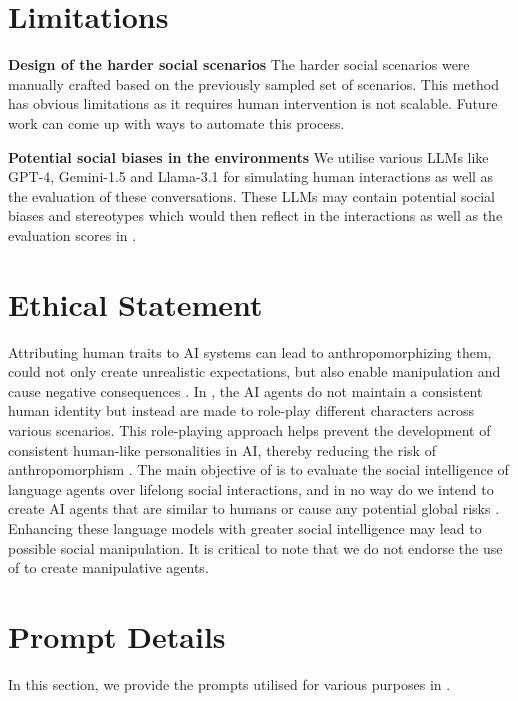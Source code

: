 \appendix

\section{Limitations}
\label{appendix:limitations}
\textbf{Design of the harder social scenarios} \quad The harder social scenarios were manually crafted based on the previously sampled set of scenarios. This method has obvious limitations as it requires human intervention is not scalable. Future work can come up with ways to automate this process.

\textbf{Potential social biases in the environments} \quad We utilise various LLMs like GPT-4, Gemini-1.5 and Llama-3.1 for simulating human interactions as well as the evaluation of these conversations. These LLMs may contain potential social biases and stereotypes which would then reflect in the interactions as well as the evaluation scores in \lifelongsotopia. 

\section{Ethical Statement}
\label{appendix:ethical}
Attributing human traits to AI systems can lead to anthropomorphizing them, could not only create unrealistic expectations, but also enable manipulation and cause negative consequences \citep{deshpande2023anthropomorphizationaiopportunitiesrisks}. In \lifelongsotopia, the AI agents do not maintain a consistent human identity but instead are made to role-play different characters across various scenarios. This role-playing approach helps prevent the development of consistent human-like personalities in AI, thereby reducing the risk of anthropomorphism \citep{shanahan2023roleplaylargelanguagemodels}. The main objective of \lifelongsotopia is to evaluate the social intelligence of language agents over lifelong social interactions, and in no way do we intend to create AI agents that are similar to humans or cause any potential global risks \citep{inbook}. Enhancing these language models with greater social intelligence may lead to possible social manipulation. It is critical to note that we do not endorse the use of \lifelongsotopia to create manipulative agents.

\section{Prompt Details}
\label{appendix:prompts}
In this section, we provide the prompts utilised for various purposes in \lifelongsotopia. 

